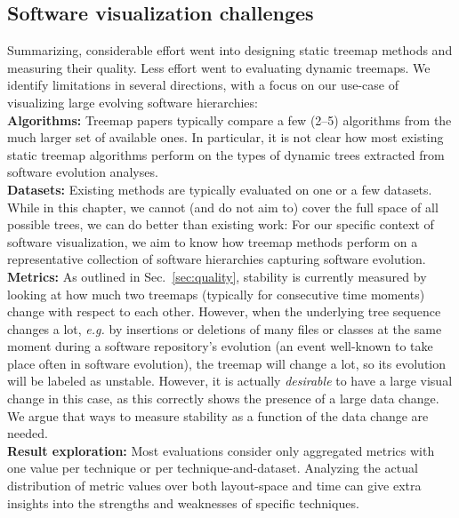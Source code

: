
\subsection{Software visualization challenges}
\label{sec:current_state}
%
%
Summarizing, considerable effort went into designing static treemap methods and measuring their quality. Less effort went to evaluating dynamic treemaps. We identify limitations in several directions, with a focus on our use-case of visualizing large evolving software hierarchies:\\

\noindent\textbf{Algorithms:} Treemap papers typically compare a few (2--5) algorithms from the much larger set of available ones. In particular, it is not clear how most existing static treemap algorithms perform on the types of dynamic trees extracted from software evolution analyses.\\

\noindent\textbf{Datasets:} Existing methods are typically evaluated on one or a few datasets. While in this chapter, we cannot (and do not aim to) cover the full space of all possible trees, we can do better than existing work: For our specific context of software visualization, we aim to know how treemap methods perform on a representative collection of software hierarchies capturing software evolution.\\

\noindent\textbf{Metrics:} As outlined in Sec.~\ref{sec:quality}, stability is currently measured by looking at how much two treemaps (typically for consecutive time moments) change with respect to each other. However, when the underlying tree sequence changes a lot, \emph{e.g.} by insertions or deletions of many files or classes at the same moment during a software repository's evolution (an event well-known to take place often in software evolution), the treemap will change a lot, so its evolution will be labeled as unstable. However, it is actually \emph{desirable} to have a large visual change in this case, as this correctly shows the presence of a large data change. We argue that ways to measure stability as a function of the data change are needed.\\

\noindent\textbf{Result exploration:} Most evaluations consider only aggregated metrics with one value per technique or per technique-and-dataset. Analyzing the actual distribution of metric values over both layout-space and time can give extra insights into the strengths and weaknesses of specific techniques.\\


